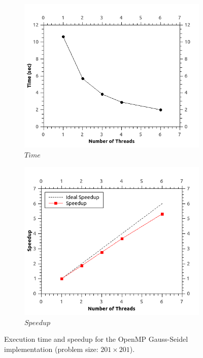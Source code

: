 \documentclass[11pt]{report}
\begin{document}
\begin{figure}[th!]
\centering
\begin{subfigure}{0.45\textwidth}
  \centering
  \includegraphics[width=1.0\linewidth]{images/gauss_time_201}
  \caption{$Time$}
\end{subfigure}
\begin{subfigure}{0.45\textwidth}
  \centering
  \includegraphics[width=1.0\linewidth]{images/gauss_speedup_201}
  \caption{$Speedup$}
\end{subfigure}
\caption{Execution time and speedup for the OpenMP Gauss-Seidel implementation (problem size: $201 \times 201$). }
\label{fig:example5.6}
\end{figure}
\end{document}
